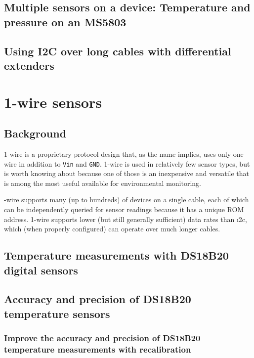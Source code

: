 \subsection{\color{gray} Multiple sensors on a device: Temperature and pressure on an MS5803 \color{black}}
\subsection{\color{gray} Using I2C over long cables with differential extenders \color{black}}


\section{\color{gray}1-wire sensors \color{black}}
\subsection{\color{gray} Background \color{black}}
1-wire is a proprietary protocol design that, as the name implies, uses only one wire in addition to \texttt{Vin} and \texttt{GND}.
1-wire is used in relatively few sensor types, but is worth knowing about because one of those is an inexpensive and versatile  that is among the most useful available for environmental monitoring.

-wire supports many (up to hundreds) of devices on a single cable, each of which can be independently queried for sensor readings because it has a unique ROM address.
1-wire supports lower (but still generally sufficient) data rates than \i2c, which (when properly configured) can operate over much longer cables.

\subsection{\color{gray} Temperature measurements with DS18B20 digital sensors \color{black}}
\subsection{\color{gray} Accuracy and precision of DS18B20 temperature sensors \color{black}}
\subsubsection{\color{gray} Improve the accuracy and precision of DS18B20 temperature measurements with recalibration \color{black}}
